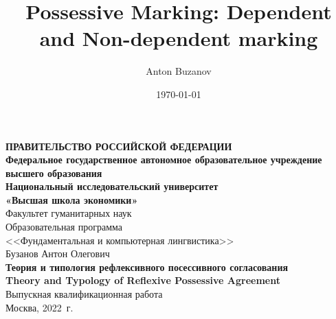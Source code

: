 

\usepackage{multirow}

\singlespacing

\author{Anton Buzanov}
\title{Possessive Marking: Dependent and Non-dependent marking}
\date{\today}


\thispagestyle{empty}	
\begin{center}
	{\fontsize{14pt}{1}\selectfont \textbf{ПРАВИТЕЛЬСТВО РОССИЙСКОЙ ФЕДЕРАЦИИ\\[0.5em]Федеральное государственное автономное образовательное учреждение высшего образования\vspace{2em}\\Национальный исследовательский университет\\[0.5em]«Высшая школа экономики»} \\[2em]}
	{\hfill \fontsize{14pt}{1}\selectfont Факультет гуманитарных наук \\[0.5em]}
	{\hfill \fontsize{14pt}{1}\selectfont Образовательная программа \\[0.5em]}
	{\hfill \fontsize{14pt}{1}\selectfont <<Фундаментальная и компьютерная лингвистика>> \\[3em]}
	{\fontsize{14pt}{1}\selectfont Бузанов Антон Олегович \\[2em]}
	{\fontsize{14pt}{1}\selectfont \textbf{Теория и типология рефлексивного посессивного согласования} \\[0.5em]}
	{\fontsize{14pt}{1}\selectfont \textbf{Theory and Typology of Reflexive Possessive Agreement} \\[2em]}
	{\fontsize{14pt}{1}\selectfont Выпускная квалификационная работа\\[2em]}
	\fontsize{14pt}{1} 
	\vspace*{\fill}
	{\fontsize{14pt}{1}\selectfont Москва, 2022~г.}
	
\end{center}

